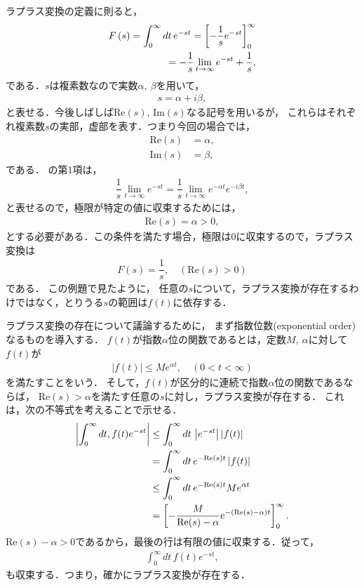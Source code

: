 ラプラス変換の定義に則ると，
\begin{align}
 F\left(s\right) = \int_{0}^{\infty}dt\,e^{-st} = \left[-\dfrac{1}{s}e^{-st}\right]_{0}^{\infty} \notag \\
                 = -\dfrac{1}{s}\lim_{t\to \infty}e^{-st} + \dfrac{1}{s}, \label{chap03_reidai01} 
\end{align}
である．$s$は複素数なので実数$\alpha,~\beta$を用いて，
\begin{align}
  s = \alpha + i \beta,  
\end{align}
と表せる．今後しばしば$\mathrm{Re}(s)$, $\mathrm{Im}(s)$なる記号を用いるが，
これらはそれぞれ複素数$s$の実部，虚部を表す．つまり今回の場合では，
\begin{align}
 \mathrm{Re}(s) &= \alpha, \\
 \mathrm{Im}(s) &= \beta, 
\end{align}
である．
の第1項は，
\begin{align}
  \dfrac{1}{s}\lim_{t\to \infty}e^{-st} = \dfrac{1}{s}\lim_{t\to \infty}e^{-\alpha t}e^{-i\beta t}, 
\end{align}
と表せるので，極限が特定の値に収束するためには，
\begin{align}
  \mathrm{Re}(s) = \alpha > 0, 
\end{align}
とする必要がある．この条件を満たす場合，極限は0に収束するので，ラプラス変換は
\begin{align}
  F(s) = \dfrac{1}{s}, \quad (\mathrm{Re}(s) > 0) 
\end{align}
である．
%
\newpage
%
この例題で見たように，
任意の$s$について，ラプラス変換が存在するわけではなく，とりうる$s$の範囲は$f(t)$に依存する．

ラプラス変換の存在について議論するために，
まず指数位数(exponential order)なるものを導入する．
$f(t)$が指数$\alpha$位の関数であるとは，定数$M,~\alpha$に対して$f(t)$が
\begin{align}
 \left|f(t)\right| \leq M e^{\alpha t}, \quad (0< t < \infty)
\end{align}
を満たすことをいう．
そして，$f(t)$が区分的に連続で指数$\alpha$位の関数であるならば，
$\mathrm{Re}(s)>\alpha$を満たす任意の$s$に対し，ラプラス変換が存在する．
これは，次の不等式を考えることで示せる．
\begin{align}
  \left|\int_{0}^{\infty}dt,f(t)e^{-st}\right| 
    & \leq \int_{0}^{\infty}dt \, \left|e^{-st}\right| \left|f(t)\right| \notag \\
    & = \int_{0}^{\infty}dt \, e^{-\mathrm{Re}(s)t} \left|f(t)\right| \notag \\
    & \leq \int_{0}^{\infty}dt \, e^{-\mathrm{Re}(s)t} Me^{\alpha t} \notag \\
    & = \left[-\dfrac{M}{\mathrm{Re}(s)-\alpha}e^{-\left(\mathrm{Re}(s)-\alpha\right)t}\right]_{0}^{\infty}. 
\end{align}
$\mathrm{Re}(s) - \alpha > 0$であるから，最後の行は有限の値に収束する．従って，
\begin{align}
  \int_{0}^{\infty}dt\,f(t)e^{-st},
\end{align}
も収束する．つまり，確かにラプラス変換が存在する．

